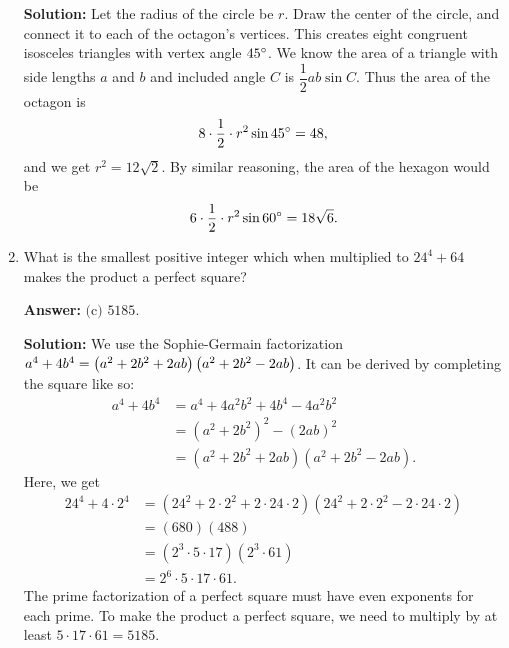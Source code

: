 \documentclass[11pt,paper=letter]{scrartcl}
\begin{document}
\begin{enumerate}[left=0pt]
\begin{center}
\end{center}
\textbf{Solution:} Let the radius of the circle be $r$. Draw the center of the circle, and connect it to each of the octagon's vertices. This creates eight congruent isosceles triangles with vertex angle $45^\circ$. We know the area of a triangle with side lengths $a$ and $b$ and included angle $C$ is $\dfrac12 ab \sin C$. Thus the area of the octagon is $$8 \cdot \dfrac12 \cdot r^2 \sin 45^\circ = 48,$$ and we get $r^2 = 12\sqrt2$. By similar reasoning, the area of the hexagon would be $$6 \cdot \dfrac12 \cdot r^2 \sin 60^\circ = 18\sqrt6.$$

\item What is the smallest positive integer which when multiplied to $24^4 + 64$ makes the product a perfect square?


\textbf{Answer:} $\boxed{\text{(c) }5185}$.

\textbf{Solution:} We use the Sophie-Germain factorization $a^4 + 4b^4 = \left( a^2 + 2b^2 + 2ab \right)\left( a^2 + 2b^2 - 2ab \right)$. It can be derived by completing the square like so: \begin{align*}
  a^4 + 4b^4 &= a^4 + 4a^2b^2 + 4b^4 - 4a^2b^2 \\
  &= (a^2 + 2b^2)^2 - (2ab)^2 \\
  &= (a^2 + 2b^2 + 2ab)(a^2 + 2b^2 - 2ab).
\end{align*} Here, we get \begin{align*}
24^4 + 4\cdot 2^4 &= (24^2 + 2\cdot 2^2 + 2\cdot 24 \cdot 2)(24^2 + 2 \cdot 2^2 - 2 \cdot 24 \cdot 2) \\
&= (680)(488) \\
&= (2^3 \cdot 5 \cdot 17)(2^3 \cdot 61) \\
&= 2^6 \cdot 5 \cdot 17 \cdot 61.
\end{align*} The prime factorization of a perfect square must have even exponents for each prime. To make the product a perfect square, we need to multiply by at least $5 \cdot 17 \cdot 61 = 5185$.


\end{enumerate}
\end{document}
